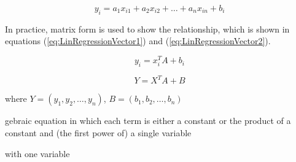 \documentclass[runningheads,a4paper]{llncs}
\begin{document}
\begin{equation}\label{eq:LinRegressionY}
    y_i=a_1x_{i1}+a_2x_{i2}+\dots+a_nx_{in}+b_i
\end{equation}\label{eq:LinRegressionY}

In practice, matrix form is used to show the relationship, which is shown in equations (\ref{eq:LinRegressionVector1}) and (\ref{eq:LinRegressionVector2}).

\begin{equation}\label{eq:LinRegressionVector1}
    y_i=x_i^TA+b_i
\end{equation}\label{eq:LinRegressionVector1}

\begin{equation}\label{eq:LinRegressionVector2}
    Y=X^TA+B
\end{equation}\label{eq:LinRegressionVector2}

where $Y=(y_1, y_2, \dots, y_n)$, $B=(b_1, b_2, \dots, b_n)$


gebraic equation in which each term is either a constant or the product of a constant and (the first power of) a single variable 


with one variable      

\cite{Colin15applied}
\end{document}
